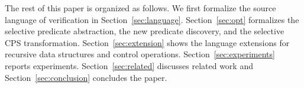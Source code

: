 
The rest of this paper is organized as follows.
We first formalize the source language of verification in
Section~\ref{sec:language}.  Section~\ref{sec:opt} formalizes the
selective predicate abstraction, the new predicate discovery, and the
selective CPS transformation.  Section~\ref{sec:extension} shows the
language extensions for recursive data structures and control
operations.  Section~\ref{sec:experiments} reports experiments.
Section~\ref{sec:related} discusses related work and
Section~\ref{sec:conclusion} concludes the paper.














